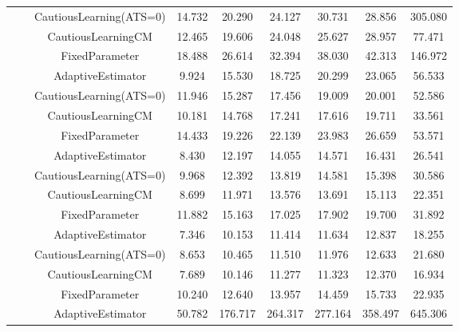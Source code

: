 \begin{table}[!h]
\begin{tabular}[t]{ccccccccc}
 &  & CautiousLearning(ATS=0) & 14.732 & 20.290 & 24.127 & 30.731 & 28.856 & 305.080\\

 &  & CautiousLearningCM & 12.465 & 19.606 & 24.048 & 25.627 & 28.957 & 77.471\\

 & \multirow[t]{-4}{*}{\centering\arraybackslash 0.75} & FixedParameter & 18.488 & 26.614 & 32.394 & 38.030 & 42.313 & 146.972\\
\cmidrule{2-9}
 &  & AdaptiveEstimator & 9.924 & 15.530 & 18.725 & 20.299 & 23.065 & 56.533\\

 &  & CautiousLearning(ATS=0) & 11.946 & 15.287 & 17.456 & 19.009 & 20.001 & 52.586\\

 &  & CautiousLearningCM & 10.181 & 14.768 & 17.241 & 17.616 & 19.711 & 33.561\\

 & \multirow[t]{-4}{*}{\centering\arraybackslash 1.00} & FixedParameter & 14.433 & 19.226 & 22.139 & 23.983 & 26.659 & 53.571\\
\cmidrule{2-9}
 &  & AdaptiveEstimator & 8.430 & 12.197 & 14.055 & 14.571 & 16.431 & 26.541\\

 &  & CautiousLearning(ATS=0) & 9.968 & 12.392 & 13.819 & 14.581 & 15.398 & 30.586\\

 &  & CautiousLearningCM & 8.699 & 11.971 & 13.576 & 13.691 & 15.113 & 22.351\\

 & \multirow[t]{-4}{*}{\centering\arraybackslash 1.25} & FixedParameter & 11.882 & 15.163 & 17.025 & 17.902 & 19.700 & 31.892\\
\cmidrule{2-9}
 &  & AdaptiveEstimator & 7.346 & 10.153 & 11.414 & 11.634 & 12.837 & 18.255\\

 &  & CautiousLearning(ATS=0) & 8.653 & 10.465 & 11.510 & 11.976 & 12.633 & 21.680\\

 &  & CautiousLearningCM & 7.689 & 10.146 & 11.277 & 11.323 & 12.370 & 16.934\\

\multirow[t]{-28}{*}{\centering\arraybackslash 1} & \multirow[t]{-4}{*}{\centering\arraybackslash 1.50} & FixedParameter & 10.240 & 12.640 & 13.957 & 14.459 & 15.733 & 22.935\\
\cmidrule{1-9}
 &  & AdaptiveEstimator & 50.782 & 176.717 & 264.317 & 277.164 & 358.497 & 645.306\\


\end{tabular}
\end{table}
